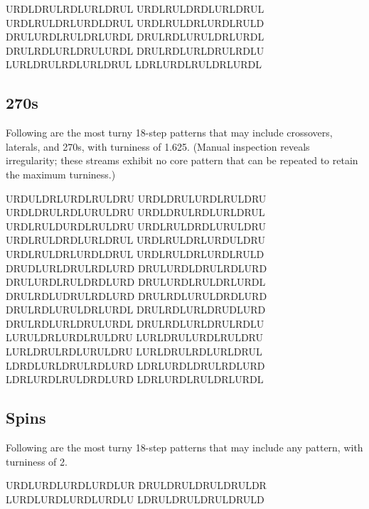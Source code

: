\documentclass[10pt]{sigplanconf}
\begin{document}
\noindent
URDLDRULRDLURLDRUL
URDLRULDRDLURLDRUL
URDLRULDRLURDLDRUL
URDLRULDRLURDLRULD
DRULURDLRULDRLURDL
DRULRDLURULDRLURDL
DRULRDLURLDRULURDL
DRULRDLURLDRULRDLU
LURLDRULRDLURLDRUL
LDRLURDLRULDRLURDL

\subsection{270s}

Following are the most turny 18-step patterns that may include crossovers, laterals, and 270s, with turniness of 1.625.
(Manual inspection reveals irregularity; these streams exhibit no core pattern that can be repeated to retain the maximum turniness.)

\noindent
URDULDRLURDLRULDRU
URDLDRULURDLRULDRU
URDLDRULRDLURULDRU
URDLDRULRDLURLDRUL
URDLRULDURDLRULDRU
URDLRULDRDLURULDRU
URDLRULDRDLURLDRUL
URDLRULDRLURDULDRU
URDLRULDRLURDLDRUL
URDLRULDRLURDLRULD
DRUDLURLDRULRDLURD
DRULURDLDRULRDLURD
DRULURDLRULDRDLURD
DRULURDLRULDRLURDL
DRULRDLUDRULRDLURD
DRULRDLURULDRDLURD
DRULRDLURULDRLURDL
DRULRDLURLDRUDLURD
DRULRDLURLDRULURDL
DRULRDLURLDRULRDLU
LURULDRLURDLRULDRU
LURLDRULURDLRULDRU
LURLDRULRDLURULDRU
LURLDRULRDLURLDRUL \\
LDRDLURLDRULRDLURD
LDRLURDLDRULRDLURD
LDRLURDLRULDRDLURD
LDRLURDLRULDRLURDL

\subsection{Spins}

Following are the most turny 18-step patterns that may include any pattern, with turniness of 2.

\noindent
URDLURDLURDLURDLUR
DRULDRULDRULDRULDR
LURDLURDLURDLURDLU
LDRULDRULDRULDRULD



\end{document}
